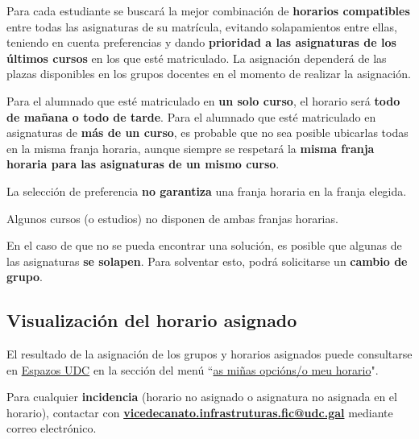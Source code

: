 Para cada estudiante se buscará la mejor combinación de \textbf{horarios compatibles} entre todas las asignaturas de su matrícula, evitando solapamientos entre ellas, teniendo en cuenta preferencias y dando \textbf{prioridad a las asignaturas de los últimos cursos} en los que esté matriculado. La asignación dependerá de las plazas disponibles en los grupos docentes en el momento de realizar la asignación.

Para el alumnado que esté matriculado en \textbf{un solo curso}, el horario será \textbf{todo de mañana o todo de tarde}. Para el alumnado que esté matriculado en asignaturas de \textbf{más de un curso}, es probable que no sea posible ubicarlas todas en la misma franja horaria, aunque siempre se respetará la \textbf{misma franja horaria para las asignaturas de un mismo curso}.

\begin{warningBox}
    La selección de preferencia \textbf{no garantiza} una franja horaria en la franja elegida.
\end{warningBox}

\begin{warningBox}
    Algunos cursos (o estudios) no disponen de ambas franjas horarias.
\end{warningBox}

\begin{importantBox}
    En el caso de que no se pueda encontrar una solución, es posible que algunas de las asignaturas \textbf{se solapen}. Para solventar esto, podrá solicitarse un \textbf{cambio de grupo}.
\end{importantBox}

\subsection{Visualización del horario asignado}

El resultado de la asignación de los grupos y horarios asignados puede consultarse en \href{\linkEspazosUDC}{Espazos UDC} en la sección del menú  ``\href{https://espazos.udc.es/centers/614/timetable/preference}{as miñas opcións/o meu horario}".

\begin{importantBox}
    Para cualquier \textbf{incidencia} (horario no asignado o asignatura no asignada en el horario), contactar con \href{mailto:vicedecanato.infrastruturas.fic@udc.gal}{\textbf{vicedecanato.infrastruturas.fic@udc.gal}} mediante correo electrónico.
\end{importantBox}

